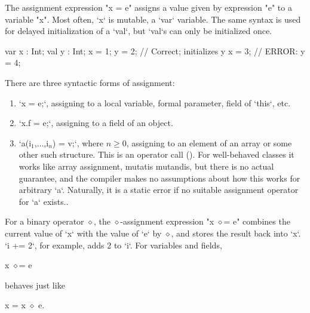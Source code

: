 The assignment expression \xcd"x = e" assigns a value given by
expression \xcd"e"
to a variable \xcd"x".  
Most often, \xcd`x` is mutable, a \xcd`var` variable.  The same syntax is
used for delayed initialization of a \xcd`val`, but \xcd`val`s can only be
initialized once.
\begin{xten}
  var x : Int;
  val y : Int;
  x = 1;
  y = 2; // Correct; initializes y
  x = 3; 
  // ERROR: y = 4;
\end{xten}


There are three syntactic forms of
assignment: 
\begin{enumerate}
\item \xcd`x = e;`, assigning to a local variable, formal parameter, field of
      \xcd`this`, etc. 
\item \xcd`x.f = e;`, assigning to a field of an object.
\item \xcdmath`a(i$_1$,$\ldots$,i$_n$) = v;`, where {$n \ge 0$}, assigning to
      an element of an array or some other such structure. This is an operator
      call ().  For well-behaved classes it works like
      array assignment, mutatis mutandis, but there is no actual guarantee,
      and the compiler makes no assumptions about how this works for arbitrary \xcd`a`.
      Naturally, it is a static error if no suitable assignment operator
      for \xcd`a` exists..
\end{enumerate}

For a binary operator $\diamond$, the $\diamond$-assignment expression
\xcdmath"x $\diamond$= e" combines the current value of \xcd`x` with the value
of \xcd`e` by {$\diamond$}, and stores the result back into \xcd`x`.  
\xcd`i += 2`, for example, adds 2 to \xcd`i`. For variables and fields, 
\begin{xtenmath}
x $\diamond$= e 
\end{xtenmath}
behaves just like 
\begin{xtenmath}
x = x $\diamond$ e.
\end{xtenmath}

